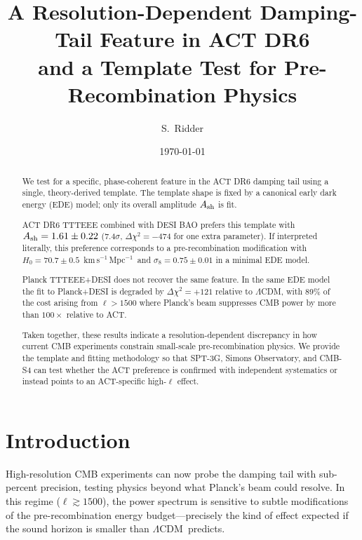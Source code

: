\documentclass[twocolumn,showpacs,preprintnumbers,amsmath,amssymb,prd]{revtex4-2}
\newcommand{\lcdm}{$\Lambda$CDM}
\newcommand{\kms}{km\,s$^{-1}$\,Mpc$^{-1}$}
\begin{document}
\title{A Resolution-Dependent Damping-Tail Feature in ACT DR6\\
and a Template Test for Pre-Recombination Physics}

\author{S.~Ridder}

\date{\today}

\begin{abstract}
We test for a specific, phase-coherent feature in the ACT DR6 damping tail 
using a single, theory-derived template. The template shape is fixed by a 
canonical early dark energy (EDE) model; only its overall amplitude 
$A_{\rm sh}$ is fit.

ACT DR6 TTTEEE combined with DESI BAO prefers this template with 
$A_{\rm sh} = 1.61 \pm 0.22$ (7.4$\sigma$, $\Delta\chi^2 = -474$ for one 
extra parameter). If interpreted literally, this preference corresponds 
to a pre-recombination modification with $H_0 = 70.7 \pm 0.5$~\kms\ and 
$\sigma_8 = 0.75 \pm 0.01$ in a minimal EDE model.

Planck TTTEEE+DESI does not recover the same feature. In the same EDE 
model the fit to Planck+DESI is degraded by $\Delta\chi^2 = +121$ relative 
to \lcdm, with 89\% of the cost arising from $\ell > 1500$ where Planck's 
beam suppresses CMB power by more than $100\times$ relative to ACT.

Taken together, these results indicate a resolution-dependent discrepancy 
in how current CMB experiments constrain small-scale pre-recombination 
physics. We provide the template and fitting methodology so that SPT-3G, 
Simons Observatory, and CMB-S4 can test whether the ACT preference is 
confirmed with independent systematics or instead points to an ACT-specific 
high-$\ell$ effect.
\end{abstract}

\maketitle

\section{Introduction}
\label{sec:intro}

High-resolution CMB experiments can now probe the damping tail with sub-percent precision, testing physics beyond what Planck's beam could resolve. In this regime ($\ell \gtrsim 1500$), the power spectrum is sensitive to subtle modifications of the pre-recombination energy budget---precisely the kind of effect expected if the sound horizon is smaller than \lcdm\ predicts.
\end{document}
